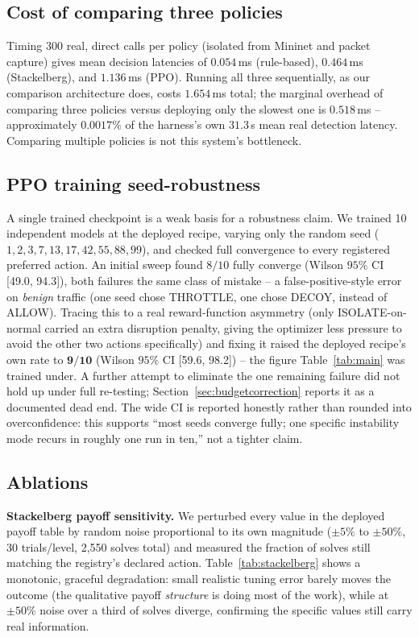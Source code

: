 \documentclass[conference]{IEEEtran}
\newcommand{\ci}[2]{[#1, #2]}
\begin{document}
\subsection{Cost of comparing three policies}
\label{sec:cost}

Timing $300$ real, direct calls per policy (isolated from Mininet and packet capture) gives mean
decision latencies of $0.054\,$ms (rule-based), $0.464\,$ms (Stackelberg), and $1.136\,$ms (PPO).
Running all three sequentially, as our comparison architecture does, costs $1.654\,$ms total; the
marginal overhead of comparing three policies versus deploying only the slowest one is
$0.518\,$ms -- approximately $0.0017\%$ of the harness's own $31.3\,$s mean real detection latency.
Comparing multiple policies is not this system's bottleneck.

\subsection{PPO training seed-robustness}
\label{sec:seedrobustness}

A single trained checkpoint is a weak basis for a robustness claim. We trained 10 independent
models at the deployed recipe, varying only the random seed
($1,2,3,7,13,17,42,55,88,99$), and checked full convergence to every registered preferred action.
An initial sweep found $8/10$ fully converge (Wilson $95\%$ CI \ci{49.0}{94.3}), both failures the
same class of mistake -- a false-positive-style error on \emph{benign} traffic (one seed chose
THROTTLE, one chose DECOY, instead of ALLOW). Tracing this to a real reward-function asymmetry
(only ISOLATE-on-normal carried an extra disruption penalty, giving the optimizer less pressure to
avoid the other two actions specifically) and fixing it raised the deployed recipe's own rate to
$\mathbf{9/10}$ (Wilson $95\%$ CI \ci{59.6}{98.2}) -- the figure Table~\ref{tab:main} was trained
under. A further attempt to eliminate the one remaining failure did not hold up under full
re-testing; Section~\ref{sec:budgetcorrection} reports it as a documented dead end. The wide CI is
reported honestly rather than rounded into overconfidence: this supports ``most seeds converge
fully; one specific instability mode recurs in roughly one run in ten,'' not a tighter claim.

\subsection{Ablations}

\textbf{Stackelberg payoff sensitivity.} We perturbed every value in the deployed payoff table by
random noise proportional to its own magnitude ($\pm5\%$ to $\pm50\%$, 30 trials/level, 2{,}550
solves total) and measured the fraction of solves still matching the registry's declared action.
Table~\ref{tab:stackelberg} shows a monotonic, graceful degradation: small realistic tuning error
barely moves the outcome (the qualitative payoff \emph{structure} is doing most of the work), while
at $\pm50\%$ noise over a third of solves diverge, confirming the specific values still carry real
information.
\end{document}
